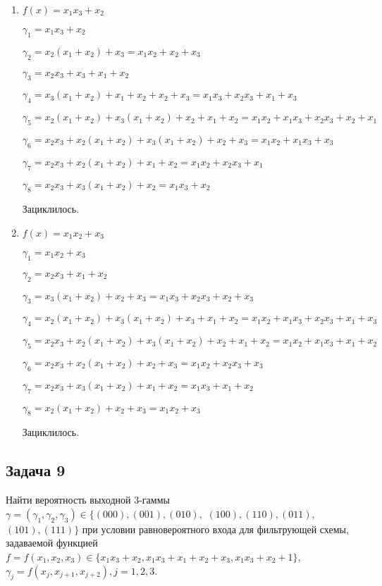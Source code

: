 \documentclass[utf8x, 14pt]{G7-32} %
\begin{document}
\begin{enumerate}
    \item $f(x)=x_1 x_3 + x_2$
    
    $\gamma_1= x_1 x_3 +x_2$
    
    $\gamma_2 = x_2 (x_1 + x_2) + x_3 = x_1 x_2 + x_2 + x_3$
    
    $\gamma_3 = x_2 x_3 + x_3 + x_1 + x_2$
    
    $\gamma_4 = x_3 (x_1 + x_2) + x_1 + x_2 + x_2 + x_3 = x_1 x_3 + x_2 x_3 + x_1 + x_3$
    
    $\gamma_5 = x_2 (x_1 + x_2) + x_3 (x_1 + x_2) + x_2 + x_1 + x_2 = x_1 x_2 + x_1 x_3 + x_2 x_3 + x_2 +x_1$
    
    $\gamma_6 = x_2 x_3 + x_2 (x_1 + x_2) + x_3 (x_1 + x_2) + x_2 + x_3 = x_1 x_2 + x_1 x_3 + x_3$
    
    $\gamma_7 = x_2 x_3 + x_2 (x_1 + x_2) + x_1 + x_2 = x_1 x_2 + x_2 x_3 + x_1$
    
    $\gamma_8 = x_2 x_3 + x_3 (x_1 + x_2) + x_2 = x_1 x_3 + x_2$
    
    Зациклилось.
    
    
    \item $f(x)=x_1 x_2 + x_3$
    
    $\gamma_1 = x_1 x_2 + x_3$
    
    $\gamma_2 = x_2 x_3 + x_1 + x_2$
    
    $\gamma_3 = x_3 (x_1 + x_2) + x_2 + x_3 = x_1 x_3 + x_2 x_3 + x_2 + x_3$
    
    $\gamma_4 = x_2 (x_1 + x_2) + x_3 (x_1 + x_2) + x_3 + x_1 + x_2 = x_1 x_2 + x_1 x_3 + x_2 x_3 + x_1 + x_3$
    
    $\gamma_5 = x_2 x_3 + x_2 (x_1 + x_2) + x_3 (x_1 + x_2) +x_2 + x_1 + x_2 = x_1 x_2 + x_1 x_3 + x_1 + x_2$
    
    $\gamma_6 = x_2 x_3 + x_2 (x_1 + x_2) + x_2 + x_3 = x_1 x_2 + x_2 x_3 + x_3$
    
    $\gamma_7 = x_2 x_3 + x_3 (x_1 + x_2) + x_1 + x_2 = x_1 x_3 + x_1 + x_2$
    
    $\gamma_8 = x_2 (x_1 + x_2) + x_2 + x_3 = x_1 x_2 + x_3$
    
    Зациклилось.
\end{enumerate}


\subsection{Задача 9}
Найти вероятность выходной 3-гаммы $\gamma = (\gamma_1,\gamma_2,\gamma_3) \in \{ (000), (001), (010),$ $ (100), (110), (011),$ $(101), (111) \}$ при условии равновероятного входа для фильтрующей схемы, задаваемой функцией $f=f(x_1,x_2,x_3)\in \{x_1 x_3+x_2, x_1 x_3+x_1+x_2+x_3, x_1 x_3+x_2+1\}$, $\gamma_j = f(x_j, x_{j+1}, x_{j+2}), j=1,2,3$.
\end{document}
